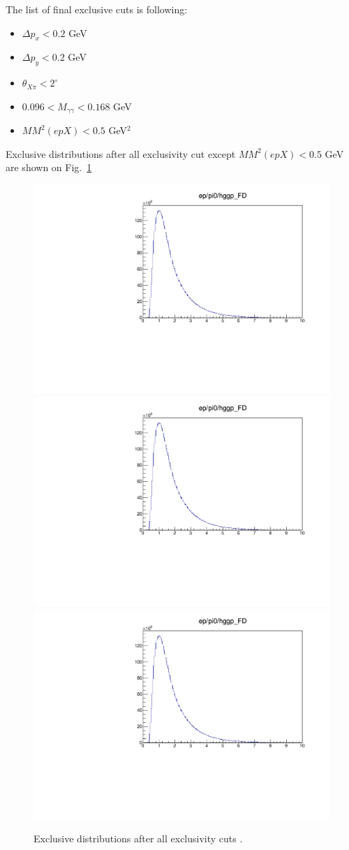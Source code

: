 The list of final exclusive cuts is following:
\begin{itemize}
	\item $\Delta p_x<0.2$ GeV
	\item $\Delta p_y<0.2$ GeV
	\item $\theta_{X\pi}<2^\circ$
	\item $0.096<M_{\gamma\gamma}<0.168$ GeV
	\item $MM^2(epX)<0.5$ GeV$^2$
\end{itemize}

Exclusive distributions after all exclusivity cut except $MM^2(epX)<0.5$ GeV are shown on Fig.~\ref{fig:finalexclusive}

\begin{figure}[hbt]
	\centering
	
	\includegraphics[page=82,width=0.32\linewidth]{figures/eppi0.exclusive.pdf}
	\includegraphics[page=83,width=0.32\linewidth]{figures/eppi0.exclusive.pdf}
	\includegraphics[page=84,width=0.32\linewidth]{figures/eppi0.exclusive.pdf}
	\caption{Exclusive distributions after all exclusivity cuts .}
	\label{fig:finalexclusive}
\end{figure}

\fi